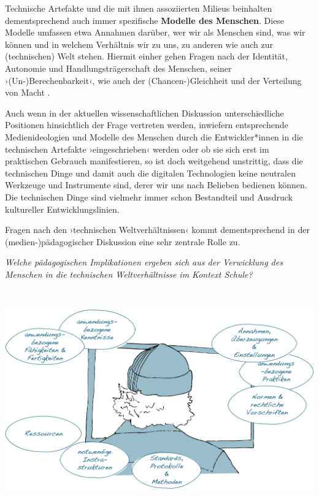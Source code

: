 \documentclass[
  a4paper,
]{book}
\begin{document}
Technische Artefakte und die mit ihnen assoziierten Milieus beinhalten dementsprechend auch immer spezifische \textbf{Modelle des Menschen}. Diese Modelle umfassen etwa Annahmen darüber, wer wir als Menschen sind, was wir können und in welchem Verhältnis wir zu uns, zu anderen wie auch zur (technischen) Welt stehen. Hiermit einher gehen Fragen nach der Identität, Autonomie und Handlungsträgerschaft des Menschen, seiner ›(Un-)Berechenbarkeit‹, wie auch der (Chancen-)Gleichheit und der Verteilung von Macht \citep[ausführlicher hierzu auch][]{sesinkMenschlicheUndKunstliche2012}.

Auch wenn in der aktuellen wissenschaftlichen Diskussion unterschiedliche Positionen hinsichtlich der Frage vertreten werden, inwiefern entsprechende Medienideologien und Modelle des Menschen durch die Entwickler*innen in die technischen Artefakte ›eingeschrieben‹ werden oder ob sie sich erst im praktischen Gebrauch manifestieren, so ist doch weitgehend unstrittig, dass die technischen Dinge und damit auch die digitalen Technologien keine neutralen Werkzeuge und Instrumente sind, derer wir uns nach Belieben bedienen können. Die technischen Dinge sind vielmehr immer schon Bestandteil und Ausdruck kultureller Entwicklungslinien.

Fragen nach den ›technischen Weltverhältnissen‹ \citep{zornSelbstWeltUnd2014} kommt dementsprechend in der (medien-)pädagogischer Diskussion eine sehr zentrale Rolle zu.

\begin{blackbox}
\emph{Welche pädagogischen Implikationen ergeben sich aus der Verwicklung des Menschen in die technischen Weltverhältnisse im Kontext Schule?}

\end{blackbox}

~

\begin{center}\includegraphics{Figures/12-02} \end{center}
\end{document}
